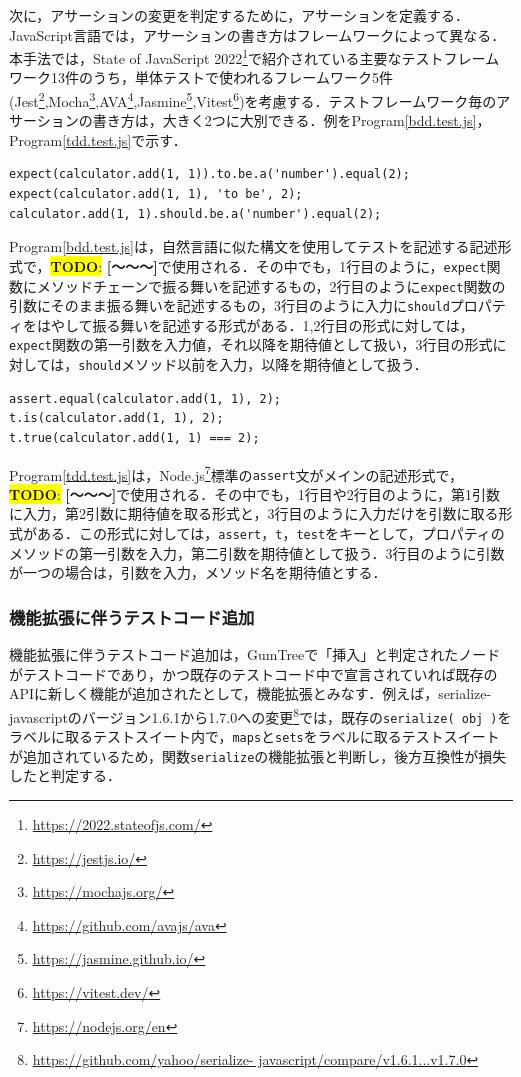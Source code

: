 \documentclass[11pt,dvipdfmx]{jreport}
\newcommand{\todo}[1]{\colorbox{yellow}{{\bf TODO}:}{\color{red} {\textbf{[#1]}}}}
\begin{document}
次に，アサーションの変更を判定するために，アサーションを定義する．JavaScript言語では，アサーションの書き方はフレームワークによって異なる．本手法では，State of JavaScript 2022\footnote{\url{https://2022.stateofjs.com/}}で紹介されている主要なテストフレームワーク13件のうち，単体テストで使われるフレームワーク5件(Jest\footnote{\url{https://jestjs.io/}},Mocha\footnote{\url{https://mochajs.org/}},AVA\footnote{\url{https://github.com/avajs/ava}},Jasmine\footnote{\url{https://jasmine.github.io/}},Vitest\footnote{\url{https://vitest.dev/}})を考慮する．テストフレームワーク毎のアサーションの書き方は，大きく2つに大別できる．例をProgram\ref{bdd.test.js}，Program\ref{tdd.test.js}で示す．

\begin{lstlisting}[caption=アサーション例1, label=bdd.test.js]
expect(calculator.add(1, 1)).to.be.a('number').equal(2);
expect(calculator.add(1, 1), 'to be', 2);
calculator.add(1, 1).should.be.a('number').equal(2);
\end{lstlisting}

Program\ref{bdd.test.js}は，自然言語に似た構文を使用してテストを記述する記述形式で，\todo{〜〜〜}で使用される．その中でも，1行目のように，{\verb|expect|}関数にメソッドチェーンで振る舞いを記述するもの，2行目のように{\verb|expect|}関数の引数にそのまま振る舞いを記述するもの，3行目のように入力に{\verb|should|}プロパティをはやして振る舞いを記述する形式がある．1,2行目の形式に対しては，{\verb|expect|}関数の第一引数を入力値，それ以降を期待値として扱い，3行目の形式に対しては，{\verb|should|}メソッド以前を入力，以降を期待値として扱う．

\begin{lstlisting}[caption=アサーション例2, label=tdd.test.js]
assert.equal(calculator.add(1, 1), 2);
t.is(calculator.add(1, 1), 2);  
t.true(calculator.add(1, 1) === 2);
\end{lstlisting}

Program\ref{tdd.test.js}は，Node.js\footnote{\url{https://nodejs.org/en}}標準の{\verb|assert|}文がメインの記述形式で，\todo{〜〜〜}で使用される．その中でも，1行目や2行目のように，第1引数に入力，第2引数に期待値を取る形式と，3行目のように入力だけを引数に取る形式がある．この形式に対しては，{\verb|assert|}，{\verb|t|}，{\verb|test|}をキーとして，プロパティのメソッドの第一引数を入力，第二引数を期待値として扱う．3行目のように引数が一つの場合は，引数を入力，メソッド名を期待値とする．

\subsubsection{機能拡張に伴うテストコード追加}
機能拡張に伴うテストコード追加は，GumTreeで「挿入」と判定されたノードがテストコードであり，かつ既存のテストコード中で宣言されていれば既存のAPIに新しく機能が追加されたとして，機能拡張とみなす．例えば，serialize-javascriptのバージョン1.6.1から1.7.0への変更\footnote{\url{https://github.com/yahoo/serialize- javascript/compare/v1.6.1...v1.7.0}}では，既存の{\verb|serialize( obj )|}をラベルに取るテストスイート内で，{\verb|maps|}と{\verb|sets|}をラベルに取るテストスイートが追加されているため，関数{\verb|serialize|}の機能拡張と判断し，後方互換性が損失したと判定する．
\end{document}
